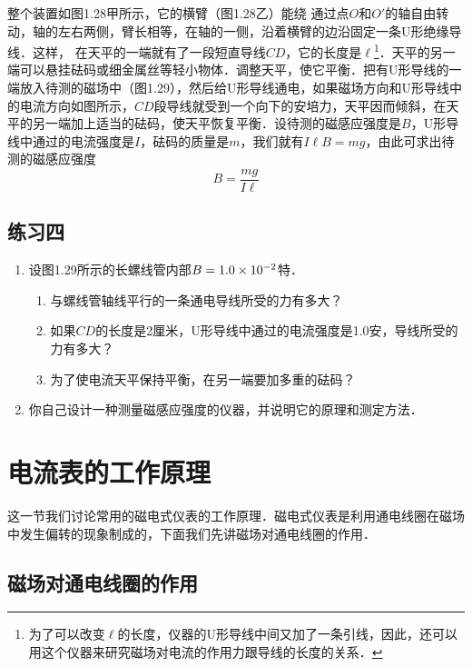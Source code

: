 整个装置如图1.28甲所示，它的横臂（图1.28乙）能绕
通过点$O$和$O'$的轴自由转动，轴的左右两侧，臂长相等，在轴的一侧，沿着横臂的边沿固定一条U形绝缘导线．这样，
在天平的一端就有了一段短直导线$CD$，它的长度是$\ell$\footnote{为了可以改变$\ell$的长度，仪器的U形导线中间又加了一条引线，因此，还可以用这个仪器来研究磁场对电流的作用力跟导线的长度的关系．}．天平的另一端可以悬挂砝码或细金属丝等轻小物体．调整天平，使它平衡．把有U形导线的一端放入待测的磁场中（图1.29），然后给U形导线通电，如果磁场方向和U形导线中的电流方向如图所示，$CD$段导线就受到一个向下的安培力，天平因而倾斜，在天平的另一端加上适当的砝码，使天平恢复平衡．设待测的磁感应强度是$B$，U形导线中通过的电流强度是$I$，砝码的质量是$m$，我们就有$I\ell B=mg$，由此可求出待测的磁感应强度
\[B=\frac{mg}{I\ell}\]


\subsection*{练习四}
\begin{enumerate}
    \item 设图1.29所示的长螺线管内部$B=1.0\times10^{-2}$特．
    \begin{enumerate}
        \item 与螺线管轴线平行的一条通电导线所受的力有多大？
        \item 如果$CD$的长度是2厘米，U形导线中通过的电流强度是1.0安，导线所受的力有多大？
        \item 为了使电流天平保持平衡，在另一端要加多重的砝码？
    \end{enumerate}
    \item 你自己设计一种测量磁感应强度的仪器，并说明它的原理和测定方法．
\end{enumerate}


\section{电流表的工作原理}
这一节我们讨论常用的磁电式仪表的工作原理．磁电式仪表是利用通电线圈在磁场中发生偏转的现象制成的，下面我们先讲磁场对通电线圈的作用．

\subsection{磁场对通电线圈的作用}

